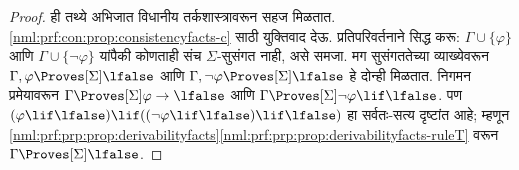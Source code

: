 \begin{proof}
  ही तथ्ये अभिजात विधानीय तर्कशास्त्रावरून सहज
  मिळतात. \ref{nml:prf:con:prop:consistencyfacts-c} साठी
  युक्तिवाद देऊ. प्रतिपरिवर्तनाने सिद्ध करू:
  $\Gamma \cup \{ \varphi \}$ आणि
  $\Gamma \cup \{ \lnot\varphi \}$ यांपैकी कोणताही
  संच $\Sigma$-सुसंगत नाही, असे समजा. मग
  सुसंगततेच्या व्याख्येवरून
  $\Gamma, \varphi \Proves[\Sigma]
  \lfalse$ आणि $\Gamma, \lnot \varphi \Proves[\Sigma] \lfalse$
  हे दोन्ही मिळतात. निगमन प्रमेयावरून
  $\Gamma \Proves[\Sigma] \varphi \to \lfalse$ आणि
  $\Gamma \Proves[\Sigma] \lnot\varphi \lif \lfalse$.
  पण $(\varphi \lif
  \lfalse) \lif ((\lnot\varphi \lif \lfalse) \lif \lfalse)$
  हा सर्वतः-सत्य दृष्टांत आहे; म्हणून
  \ref{nml:prf:prp:prop:derivabilityfacts}\ref{nml:prf:prp:prop:derivabilityfacts-ruleT}
  वरून $\Gamma \Proves[\Sigma] \lfalse$.
\end{proof}



